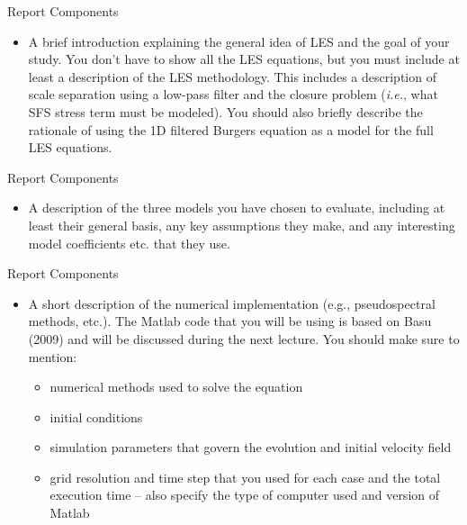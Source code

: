 \begin{frame}{Report Components}
\begin{itemize}
	\item A brief introduction explaining the general idea of LES and the goal of your study. You don't have to show all the LES equations, but you must include at least a description of the LES methodology. This includes a description of scale separation using a low-pass filter and the closure problem (\textit{i.e.}, what SFS stress term must be modeled). You should also briefly describe the rationale of using the 1D filtered Burgers equation as a model for the full LES equations.
\end{itemize}
\end{frame}

\begin{frame}{Report Components}
\begin{itemize}
	\item A description of the three models you have chosen to evaluate, including at least their general basis, any key assumptions they make, and any interesting model coefficients etc. that they use.
\end{itemize}
\end{frame}

\begin{frame}{Report Components}
\begin{itemize}
	\item A short description of the numerical implementation (e.g., pseudospectral methods, etc.).  The Matlab code that you will be using is based on Basu (2009) and will be discussed during the next lecture. You should make sure to mention:
\begin{itemize}
\item numerical methods used to solve the equation
\item initial conditions
\item simulation parameters that govern the evolution and initial velocity field
\item grid resolution and time step that you used for each case and the total execution time -- also specify the type of computer used and version of Matlab
\end{itemize}
\end{itemize}
\end{frame}

